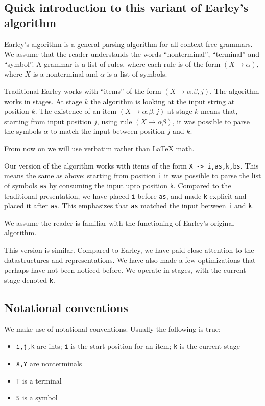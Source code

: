 \documentclass[]{article}
\begin{document}
\begin{multicols}{2}
\section{Quick introduction to this variant of Earley's algorithm}

Earley's algorithm is a general parsing algorithm for all context free
grammars. We assume that the reader understands the words
``nonterminal'', ``terminal'' and ``symbol''. A grammar is a list of
rules, where each rule is of the form \((X \rightarrow{} \alpha)\),
where \(X\) is a nonterminal and \(\alpha\) is a list of symbols.

Traditional Earley works with ``items'' of the form
\((X \rightarrow{} \alpha . \beta,j)\). The algorithm works in stages.
At stage \(k\) the algorithm is looking at the input string at position
\(k\). The existence of an item \((X \rightarrow{} \alpha . \beta,j)\)
at stage \(k\) means that, starting from input position \(j\), using
rule \((X \rightarrow{} \alpha \beta)\), it was possible to parse the
symbols \(\alpha\) to match the input between position \(j\) and \(k\).

From now on we will use verbatim rather than LaTeX math.

Our version of the algorithm works with items of the form
\texttt{X -\textgreater{} i,as,k,bs}. This means the same as above:
starting from position \texttt{i} it was possible to parse the list of
symbols \texttt{as} by consuming the input upto position \texttt{k}.
Compared to the traditional presentation, we have placed \texttt{i}
before \texttt{as}, and made \texttt{k} explicit and placed it after
\texttt{as}. This emphasizes that \texttt{as} matched the input between
\texttt{i} and \texttt{k}.

We assume the reader is familiar with the functioning of Earley's
original algorithm.

This version is similar. Compared to Earley, we have paid close
attention to the datastructures and representations. We have also made a
few optimizations that perhaps have not been noticed before. We operate
in stages, with the current stage denoted \texttt{k}.

\subsection{Notational conventions}

We make use of notational conventions. Usually the following is true:

\begin{itemize}
\item
  \texttt{i,j,k} are ints; \texttt{i} is the start position for an item;
  \texttt{k} is the current stage
\item
  \texttt{X,Y} are nonterminals
\item
  \texttt{T} is a terminal
\item
  \texttt{S} is a symbol
\end{itemize}


\end{multicols}
\end{document}
